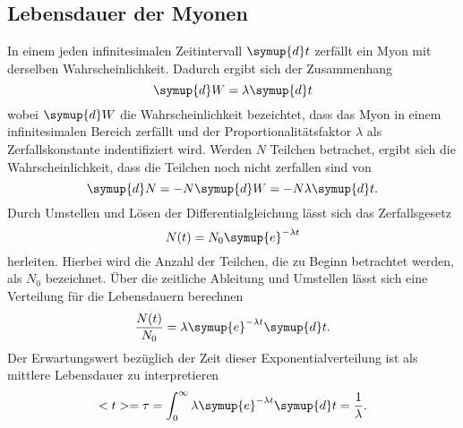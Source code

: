 \subsection{Lebensdauer der Myonen}
\label{subsec:Lebensdauer der Myonen}
In einem jeden infinitesimalen Zeitintervall $\symup{d}t$ zerfällt ein Myon mit derselben Wahrscheinlichkeit. Dadurch ergibt sich der Zusammenhang
\begin{equation*}
    \symup{d}W = \lambda \symup{d}t
\end{equation*}
wobei $\symup{d}W$ die Wahrscheinlichkeit bezeichtet, dass das Myon in einem infinitesimalen Bereich zerfällt und der Proportionalitätsfaktor $\lambda$ als Zerfallskonstante
indentifiziert wird.
Werden $N$ Teilchen betrachet, ergibt sich die Wahrscheinlichkeit, dass die Teilchen noch nicht zerfallen sind von
\begin{equation*}
    \symup{d}N = -N \symup{d}W = -N \lambda \symup{d}t.
\end{equation*} 
Durch Umstellen und Lösen der Differentialgleichung lässt sich das Zerfallsgesetz
\begin{equation*}
    N(t)=N_0\symup{e}^{-\lambda t}
\end{equation*}
herleiten. Hierbei wird die Anzahl der Teilchen, die zu Beginn betrachtet werden, als $N_0$ bezeichnet. Über die zeitliche Ableitung und Umstellen lässt sich eine Verteilung für
die Lebensdauern berechnen
\begin{equation*}
    \frac{N(t)}{N_0}=\lambda\symup{e}^{-\lambda t} \symup{d}t.
\end{equation*}
Der Erwartungswert bezüglich der Zeit dieser Exponentialverteilung ist als mittlere Lebensdauer zu interpretieren
\begin{equation}
    <t> = \tau = \int_0^\infty \lambda\symup{e}^{-\lambda t} \symup{d}t = \frac{1}{\lambda}.
    \label{eq:Lebensdauer}
\end{equation}

